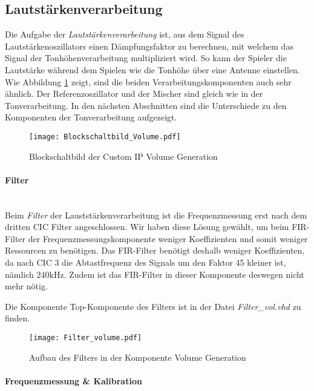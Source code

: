 \subsection{Lautstärkenverarbeitung}\label{subsec:Volume_Generation}
Die Aufgabe der \textit{Lautstärkenverarbeitung} ist, aus dem Signal des Lautstärkenoszillators einen Dämpfungsfaktor zu berechnen, mit welchem das Signal der Tonhöhenverarbeitung multipliziert wird. So kann der Spieler die Lautstärke während dem Spielen wie die Tonhöhe über eine Antenne einstellen. Wie Abbildung \ref{img:Blockschaltbild_volume} zeigt, sind die beiden Verarbeitungskomponenten auch sehr ähnlich. Der Referenzoszillator und der Mischer sind gleich wie in der Tonverarbeitung. In den nächsten Abschnitten sind die Unterschiede zu den Komponenten der Tonverarbeitung aufgezeigt.



\begin{figure}[h!]
	\centering
	\texttt{[image: Blockschaltbild\_Volume.pdf]}
	\caption{Blockschaltbild der Custom IP Volume Generation} 
	\label{img:Blockschaltbild_volume}
\end{figure}  


\newpage
\paragraph{Filter}\mbox{}\\

Beim \textit{Filter} der Lauststärkenverarbeitung ist die Frequenzmessung erst nach dem dritten CIC Filter angeschlossen. Wir haben diese Lösung gewählt, um beim FIR-Filter der Frequenzmessungskomponente weniger Koeffizienten und somit weniger Ressourcen zu benötigen. Das FIR-Filter benötigt deshalb weniger Koeffizienten, da nach CIC 3 die Abtastfrequenz des Signals um den Faktor 45 kleiner ist, nämlich 240kHz. Zudem ist das FIR-Filter in dieser Komponente deswegen nicht mehr nötig.

Die Komponente Top-Komponente des Filters ist in der Datei \textit{Filter\_vol.vhd} zu finden.

\begin{figure}[h!]
	\centering
	\texttt{[image: Filter\_volume.pdf]}
	\caption{Aufbau des Filters in der Komponente Volume Generation} 
	\label{img:Filter_Volume}
\end{figure}  

\paragraph{Frequenzmessung \& Kalibration}\mbox{}\\

